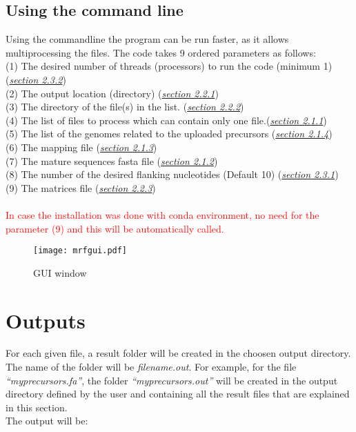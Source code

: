 \documentclass[a4paper,20pt]{report}
\newcommand{\note}{\textcolor{red}}
\begin{document}
\section{Using the command line}
\label{sec:cmnd}
\noindent
Using the commandline the program can be run faster, as it allows multiprocessing the files. The code takes 9 ordered parameters 
as follows:\\
\noindent
(1) The desired number of threads (processors) to run the code (minimum 1)(\hyperref[sec:threads]{\textit{section 2.3.2}})\\
(2) The output location (directory) (\hyperref[sec:output]{\textit{section 2.2.1}})\\
(3) The directory of the file(s) in the list. (\hyperref[sec:filesdir]{\textit{section 2.2.2}})\\
(4) The list of files to process which can contain only one file.(\hyperref[sec:fastafile]{\textit{section 2.1.1}})\\
(5) The list of the genomes related to the uploaded precursors (\hyperref[sec:genomes]{\textit{section 2.1.4}})\\
(6) The mapping file (\hyperref[sec:map]{\textit{section 2.1.3}})\\
(7) The mature sequences fasta file (\hyperref[sec:mature]{\textit{section 2.1.2}})\\
(8) The number of the desired flanking nucleotides (Default 10) (\hyperref[sec:flanking]{\textit{section 2.3.1}})\\
(9) The matrices file (\hyperref[sec:matrix]{\textit{section 2.2.3}})\\\\
\note{In case the installation was done with conda environment, no need for the parameter (9) and this 
will be automatically called.} 
\begin{figure*}[h]
  \begin{center}
    \texttt{[image: mrfgui.pdf]}
  \end{center}
  \caption{GUI window}
  \label{fig:GUIwindow}
\end{figure*}
\chapter*{Outputs}
\label{chap:outputs}
\noindent
For each given file, a result folder will be created in the choosen output directory. The name of the folder will be \textit{filename.out}.
For example, for the file \textit{``myprecursors.fa''}, the folder \textit{``myprecursors.out''} will be created in the output directory defined 
by the user and containing all the result files that are explained in this section.\\
The output will be:
\end{document}
